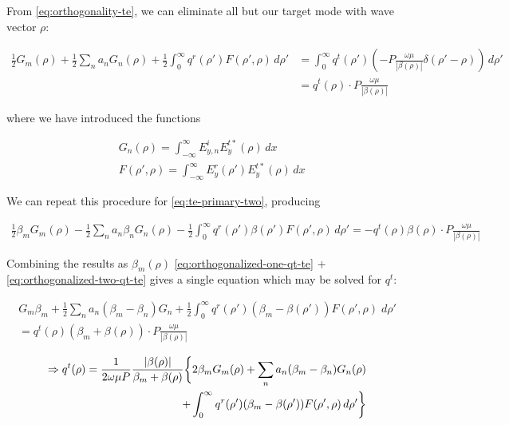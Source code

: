 \documentclass[11pt, oneside]{article}   	%
\begin{document}
\noindent From \eqref{eq:orthogonality-te}, we can eliminate all but our target mode with wave vector $\rho$:

\begin{align}
\frac{1}{2}G_{m}(\rho)
+ \frac{1}{2} \sum_{n} a_{n} G_{n}(\rho)
+ \frac{1}{2} \int_{0}^{\infty} q^{r} (\rho ') F(\rho ',\rho) \, d\rho '
&= \int_{0}^{\infty} q^{t} (\rho ') \left(-P \frac{\omega \mu}{|\beta (\rho)|} \delta (\rho '-\rho) \right) \, d\rho ' \nonumber \\
&= q^{t}(\rho) \cdot P \frac{\omega \mu}{|\beta (\rho)|}
\label{eq:orthogonalized-one-qt-te}
\end{align}

\noindent where we have introduced the functions

\begin{align}
&G_{n}(\rho) = \int_{-\infty}^{\infty} E_{y,n}^{i} E_{y}^{t*}(\rho) \, dx\\
&F (\rho ',\rho) = \int_{-\infty}^{\infty} E_{y}^{r} (\rho ') E_{y}^{t*} (\rho) \, dx
\end{align}

We can repeat this procedure for \eqref{eq:te-primary-two}, producing

\begin{align}
\frac{1}{2} \beta_{m} G_{m}(\rho)
- \frac{1}{2} \sum_{n} a_{n} \beta_{n} G_{n}(\rho)
- \frac{1}{2} \int_{0}^{\infty} q^{r} (\rho ') \beta (\rho ') F(\rho ',\rho) \, d\rho '
= -q^{t}(\rho) \beta (\rho) \cdot P \frac{\omega \mu}{|\beta (\rho)|}
\label{eq:orthogonalized-two-qt-te}
\end{align}

Combining the results as $\beta_{m} (\rho)$ \eqref{eq:orthogonalized-one-qt-te} $ + $ \eqref{eq:orthogonalized-two-qt-te} gives a single equation which may be solved for $q^{t}$:

\begin{align}
G_{m} \beta_{m} + \frac{1}{2} \sum_{n} a_{n} (\beta_{m}-\beta_{n}) G_{n} + \frac{1}{2} \int_{0}^{\infty} q^{r} (\rho ') (\beta_{m} - \beta(\rho ')) F(\rho ', \rho) \; d\rho ' \nonumber \\
= q^{t}(\rho) (\beta_{m} + \beta(\rho)) \cdot P \frac{\omega \mu}{|\beta (\rho)|}
\end{align}

\begin{equation}
\begin{split}
\Rightarrow
q^{t}(\rho) = 
\frac{1}{2 \omega \mu P} \frac{|\beta (\rho)|}{\beta_{m} + \beta (\rho)}
\bigg\{2 \beta_{m} G_{m}(\rho) + \sum_{n} a_{n} (\beta_{m} - \beta_{n}) G_{n}(\rho) \vphantom{\int_{0}^{\infty}} \\
+ \int_{0}^{\infty} q^{r} (\rho ') (\beta_{m} - \beta (\rho ')) F(\rho ',\rho) \, d\rho ' \bigg\}
\end{split}
\end{equation}
\end{document}
